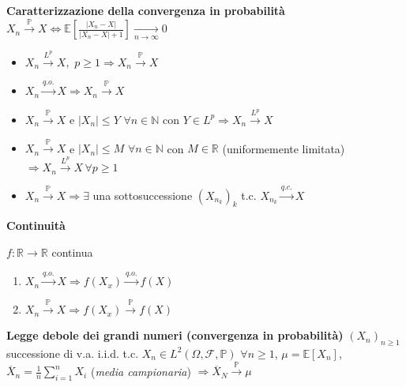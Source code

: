 \documentclass[openany]{book} %
\begin{document}
\textbf{Caratterizzazione della convergenza in probabilità} \quad $X_n\overset {\mathbb{P}}\rightarrow X \Leftrightarrow \mathbb{E}\left[\frac{|X_n-X|}{|X_n-X|+1}\right]\underset {n \rightarrow\infty}\rightarrow 0$

\begin{itemize}

\item $X_n\overset {L^p} \rightarrow X,$ $p\geq 1 \Rightarrow X_n\overset {\mathbb{P}}\rightarrow X$

\item $X_n\overset {q.o.} \rightarrow X \Rightarrow X_n\overset {\mathbb{P}}\rightarrow X$

\item $X_n\overset {\mathbb{P}}\rightarrow X$ e $|X_n|\leq Y$ $\forall n\in \mathbb{N}$ con $Y\in L^p \Rightarrow X_n\overset {L^p}\rightarrow X$

\item $X_n\overset {\mathbb{P}}\rightarrow X$ e $|X_n|\leq M$ $\forall n\in \mathbb{N}$ con $M\in \mathbb{R}$ (uniformemente limitata) $ \Rightarrow X_n\overset {L^p}\rightarrow X\, \forall p\geq 1$

\item $X_n\overset {\mathbb{P}}\rightarrow X \Rightarrow \exists$ una sottosuccessione $(X_{n_k})_k$ t.c. $X_{n_k}\overset {q.c.}\rightarrow X$

\end{itemize}

\textbf{Continuità}

$f:\mathbb{R}\rightarrow \mathbb{R}$ continua

\begin{enumerate}[label=({\alph*})]

\item $X_n\overset {q.o.}\rightarrow X \Rightarrow f(X_x) \overset {q.o.}\rightarrow f(X)$

\item $X_n\overset {\mathbb{P}}\rightarrow X \Rightarrow f(X_x) \overset {\mathbb{P}}\rightarrow f(X)$

\end{enumerate}

\textbf{Legge debole dei grandi numeri (convergenza in probabilità)} $(X_n)_{n\geq 1}$ successione di v.a. i.i.d. t.c. $X_n\in L^2(\Omega,\mathcal{F},\mathbb{P})$ $\forall n\geq 1$, $\mu=\mathbb{E}[X_n]$, $\overline{X}_n=\frac{1}{n}\sum_{i=1}^nX_i$ (\textit{media campionaria}) $\Rightarrow\overline {X}_N\overset {\mathbb{P}}\rightarrow\mu$
\end{document}
